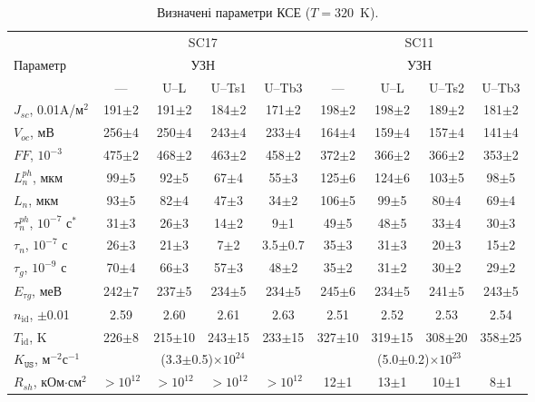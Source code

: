 \begin{table}
\caption{\label{tabSSCParam}Визначені параметри КСЕ ($T=320$~K).
}
\small
\begin{tabular}{|l|c|c|c|c|c|c|c|c|}
\hline
&\multicolumn{4}{c|}{SC17}&\multicolumn{4}{|c|}{SC11}\\
Параметр&\multicolumn{4}{c|}{УЗН}&\multicolumn{4}{|c|}{УЗН}\\ \cline{2-9}
&---&U--L&U--Ts1&U--Tb3&---&U--L&U--Ts2&U--Tb3\\
\hhline{|=========|}
$J_{sc}$, 0.01A/м$^2$&191$\pm$2&191$\pm$2&184$\pm$2&171$\pm$2&198$\pm$2&198$\pm$2&189$\pm$2&181$\pm$2\\ \hline
$V_{oc}$, мВ&256$\pm$4&250$\pm$4&243$\pm$4&233$\pm$4&164$\pm$4&159$\pm$4&157$\pm$4&141$\pm$4\\ \hline
$F\!F$, $10^{-3}$&475$\pm$2&468$\pm$2&463$\pm$2&458$\pm$2&372$\pm$2&366$\pm$2&366$\pm$2&353$\pm$2\\ \hline
$L_n^{ph}$, мкм&99$\pm$5&92$\pm$5&67$\pm$4&55$\pm$3&125$\pm$6&124$\pm$6&103$\pm$5&98$\pm$5\\ \hline
$L_n$, мкм&93$\pm$5&82$\pm$4&47$\pm$3&34$\pm$2&106$\pm$5&99$\pm$5&80$\pm$4&69$\pm$4\\ \hline
$\tau_n^{ph}$, $10^{-7}$ с$^*$&31$\pm$3&26$\pm$3&14$\pm$2&9$\pm$1&49$\pm$5&48$\pm$5&33$\pm$4&30$\pm$3\\ \hline
$\tau_n$, $10^{-7}$ с&26$\pm$3&21$\pm$3&7$\pm$2&3.5$\pm$0.7&35$\pm$3&31$\pm$3&20$\pm$3&15$\pm$2\\ \hline
$\tau_g$, $10^{-9}$ с&70$\pm$4&66$\pm$3&57$\pm$3&48$\pm$2&35$\pm$2&31$\pm$2&30$\pm$2&29$\pm$2\\ \hline
$E_{\tau g}$, меВ&242$\pm$7&237$\pm$5&234$\pm$5&234$\pm$5&245$\pm$6&234$\pm$5&241$\pm$5&243$\pm$5\\ \hline
$n_\mathrm{id}$, $\pm$0.01&2.59&2.60&2.61&2.63&2.51&2.52&2.53&2.54\\ \hline
$T_\mathrm{id}$, K&226$\pm$8&215$\pm$10&243$\pm$15&233$\pm$15&327$\pm$10&319$\pm$15&308$\pm$20&358$\pm$25\\ \hline
$K_\mathtt{US}$, м$^{-2}$с$^{-1}$&\multicolumn{4}{c|}{(3.3$\pm$0.5)$\times10^{24}$}&\multicolumn{4}{|c|}{(5.0$\pm$0.2)$\times10^{23}$}\\ \hline
$R_{sh}$, кОм$\cdot$см$^2$&$>10^{12}$&$>10^{12}$&$>10^{12}$&$>10^{12}$&12$\pm$1&13$\pm$1&10$\pm$1&8$\pm$1\\ \hline
\end{tabular}
\end{table}

